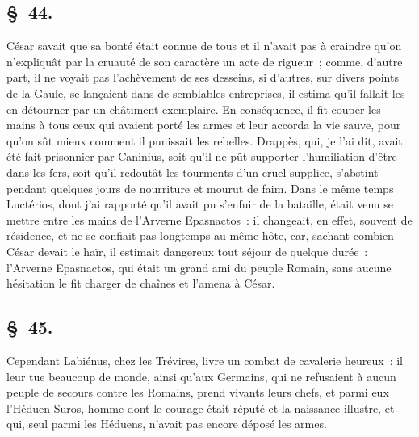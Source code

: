 \documentclass[french,twoside]{book} %
\begin{document}
\subsection[{§ 44.}]{ \textsc{§ 44.} }
\noindent César savait que sa bonté était connue de tous et il n’avait pas à craindre qu’on n’expliquât par la cruauté de son caractère un acte de rigueur ; comme, d’autre part, il ne voyait pas l’achèvement de ses desseins, si d’autres, sur divers points de la Gaule, se lançaient dans de semblables entreprises, il estima qu’il fallait les en détourner par un châtiment exemplaire. En conséquence, il fit couper les mains à tous ceux qui avaient porté les armes et leur accorda la vie sauve, pour qu’on sût mieux comment il punissait les rebelles. Drappès, qui, je l’ai dit, avait été fait prisonnier par Caninius, soit qu’il ne pût supporter l’humiliation d’être dans les fers, soit qu’il redoutât les tourments d’un cruel supplice, s’abstint pendant quelques jours de nourriture et mourut de faim. Dans le même temps Luctérios, dont j’ai rapporté qu’il avait pu s’enfuir de la bataille, était venu se mettre entre les mains de l’Arverne Epasnactos : il changeait, en effet, souvent de résidence, et ne se confiait pas longtemps au même hôte, car, sachant combien César devait le haïr, il estimait dangereux tout séjour de quelque durée : l’Arverne Epasnactos, qui était un grand ami du peuple Romain, sans aucune hésitation le fit charger de chaînes et l’amena à César.
\subsection[{§ 45.}]{ \textsc{§ 45.} }
\noindent Cependant Labiénus, chez les Trévires, livre un combat de cavalerie heureux : il leur tue beaucoup de monde, ainsi qu’aux Germains, qui ne refusaient à aucun peuple de secours contre les Romains, prend vivants leurs chefs, et parmi eux l’Héduen Suros, homme dont le courage était réputé et la naissance illustre, et qui, seul parmi les Héduens, n’avait pas encore déposé les armes.
\end{document}
